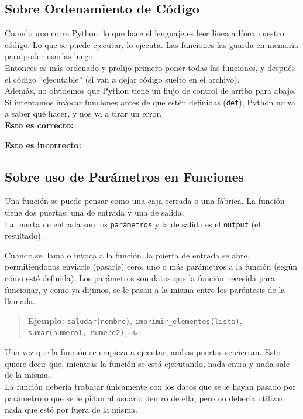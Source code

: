 \documentclass[
  letterpaper,
  DIV=11,
  numbers=noendperiod]{scrreprt}
\begin{document}
\hypertarget{sobre-ordenamiento-de-cuxf3digo}{%
\subsection{Sobre Ordenamiento de
Código}\label{sobre-ordenamiento-de-cuxf3digo}}

Cuando uno corre Python, lo que hace el lenguaje es leer línea a línea
nuestro código. Lo que se puede ejecutar, lo ejecuta. Las funciones las
guarda en memoria para poder usarlas luego.\\
Entonces es más ordenado y prolijo primero poner todas las funciones, y
después el código ``ejecutable'' (si van a dejar código suelto en el
archivo).\\

Además, no olvidemos que Python tiene un flujo de control de arriba para
abajo. Si intentamos invocar funciones antes de que estén definidas
(\texttt{def}), Python no va a saber qué hacer, y nos va a tirar un
error.\\

\textbf{Esto es correcto:}

\textbf{Esto es incorrecto:}

\hypertarget{sobre-uso-de-paruxe1metros-en-funciones}{%
\subsection{Sobre uso de Parámetros en
Funciones}\label{sobre-uso-de-paruxe1metros-en-funciones}}

Una función se puede pensar como una caja cerrada o una fábrica. La
función tiene dos puertas: una de entrada y una de salida.\\
La puerta de entrada son los \texttt{parámetros} y la de salida es el
\texttt{output} (el resultado).

Cuando se llama o invoca a la función, la puerta de entrada se abre,
permitiéndonos enviarle (pasarle) cero, uno o más parámetros a la
función (según cómo esté definida). Los parámetros son datos que la
función necesida para funcionar, y como ya dijimos, se le pasan a la
misma entre los paréntesis de la llamada.\\

\begin{quote}
\textbf{Ejemplo:} \texttt{saludar(nombre)},
\texttt{imprimir\_elementos(lista)}, \texttt{sumar(numero1,\ numero2)},
etc.
\end{quote}

Una vez que la función se empieza a ejecutar, ambas puertas se cierran.
Esto quiere decir que, mientras la función se está ejecutando, nada
entra y nada sale de la misma.\\
La función debería trabajar únicamente con los datos que se le hayan
pasado por parámetro o que se le pidan al usuario dentro de ella, pero
no debería utilizar nada que esté por fuera de la misma.
\end{document}
